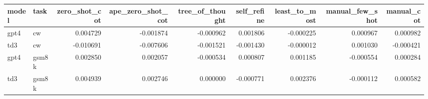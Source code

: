 \begin{tabular}{llrrrrrrr}
\toprule
model & task & zero_shot_cot & ape_zero_shot_cot & tree_of_thought & self_refine & least_to_most & manual_few_shot & manual_cot \\
\midrule
gpt4 & cw & 0.004729 & -0.001874 & -0.000962 & 0.001806 & -0.000225 & 0.000967 & 0.000982 \\
td3 & cw & -0.010691 & -0.007606 & -0.001521 & -0.001430 & -0.000012 & 0.001030 & -0.000421 \\
gpt4 & gsm8k & 0.002850 & 0.002057 & -0.000534 & 0.000807 & 0.001185 & -0.000554 & 0.000284 \\
td3 & gsm8k & 0.004939 & 0.002746 & 0.000000 & -0.000771 & 0.002376 & -0.000112 & 0.000582 \\
\bottomrule
\end{tabular}
